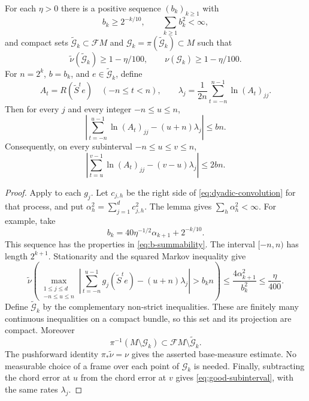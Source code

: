 \begin{proposition}\label{prop:good-frames}
For each $\eta>0$ there is a positive sequence $(b_k)_{k\geq1}$ with
\begin{equation}\label{eq:b-summability}
 b_k\geq 2^{-k/10},
 \qquad
 \sum_{k\geq1}b_k^2<\infty,
\end{equation}
and compact sets $\widetilde{\mathcal G}_k\subset\mathcal F M$ and
$\mathcal G_k=\pi(\widetilde{\mathcal G}_k)\subset M$ such that
\[
 \widetilde\nu(\widetilde{\mathcal G}_k)\geq1-\eta/100,
 \qquad \nu(\mathcal G_k)\geq1-\eta/100.
\]
For $n=2^k$, $b=b_k$, and $e\in\widetilde{\mathcal G}_k$, define
\[
 A_t=R(\widetilde S^t e)\quad(-n\leq t<n),
 \qquad
 \lambda_j=\frac1{2n}\sum_{t=-n}^{n-1}\ln(A_t)_{jj}.
\]
Then for every $j$ and every integer $-n\leq u\leq n$,
\begin{equation}\label{eq:good-chord}
 \left|\sum_{t=-n}^{u-1}\ln(A_t)_{jj}
          -(u+n)\lambda_j\right|\leq bn.
\end{equation}
Consequently, on every subinterval $-n\leq u\leq v\leq n$,
\begin{equation}\label{eq:good-subinterval}
 \left|\sum_{t=u}^{v-1}\ln(A_t)_{jj}
          -(v-u)\lambda_j\right|\leq2bn.
\end{equation}
\end{proposition}

\begin{proof}
Apply  to each $g_j$.
Let $c_{j,h}$ be the right side of
\eqref{eq:dyadic-convolution} for that process, and put
$\alpha_h^2=\sum_{j=1}^d c_{j,h}^2$.
The lemma gives $\sum_h\alpha_h^2<\infty$.
For example, take
\[
 b_k=40\eta^{-1/2}\alpha_{k+1}+2^{-k/10}.
\]
This sequence has the properties in \eqref{eq:b-summability}.
The interval $[-n,n)$ has length $2^{k+1}$.
Stationarity and the squared Markov inequality give
\[
 \widetilde\nu\!\left(
 \max_{\substack{1\leq j\leq d\\-n\leq u\leq n}}
 \left|\sum_{t=-n}^{u-1}g_j(\widetilde S^t e)
                  -(u+n)\lambda_j\right|>b_kn
 \right)
 \leq \frac{4\alpha_{k+1}^2}{b_k^2}
 \leq\frac{\eta}{400}.
\]
Define $\widetilde{\mathcal G}_k$ by the complementary non-strict
inequalities.  These are finitely many continuous inequalities on a
compact bundle, so this set and its projection are compact.
Moreover
\[
 \pi^{-1}(M\setminus\mathcal G_k)
   \subset\mathcal F M\setminus\widetilde{\mathcal G}_k.
\]
The pushforward identity $\pi_*\widetilde\nu=\nu$ gives the asserted
base-measure estimate.  No measurable choice of a frame over each
point of $\mathcal G_k$ is needed.
Finally, subtracting the chord error at $u$ from the chord error at $v$
gives \eqref{eq:good-subinterval}, with the same rates $\lambda_j$.
\end{proof}

